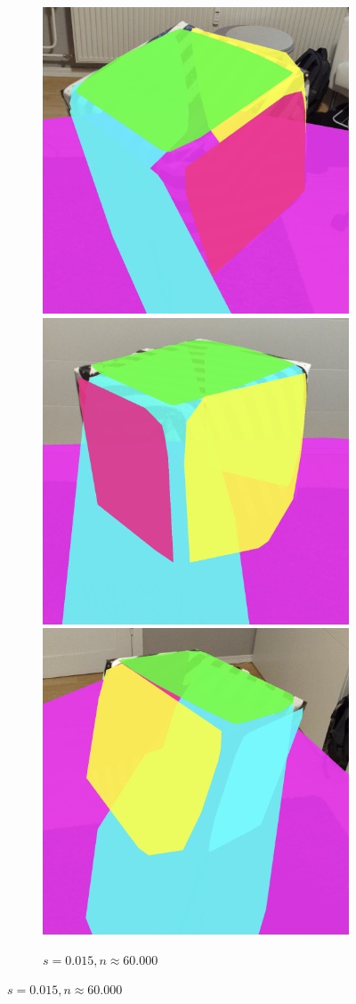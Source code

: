 \begin{figure}[h!tbp]
    \centering

    \begin{subfigure}[b]{\textwidth}
        \centering
        \includegraphics[width=0.3\linewidth]{images/cube_015_1}
        \includegraphics[width=0.3\linewidth]{images/cube_015_2}
        \includegraphics[width=0.3\linewidth]{images/cube_015_3}
        \caption{$s=0.015, n\approx60.000$}
        \label{fig:cube-results-0015}
    \end{subfigure}%

    \vspace{0.5em}


\end{figure}
